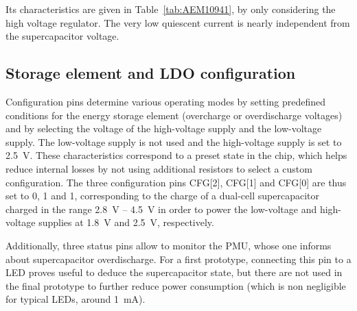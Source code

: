 \documentclass{EPL-master-thesis-covers-EN}
\begin{document}
Its characteristics are given in Table~\ref{tab:AEM10941}, by only considering the high voltage regulator. The very low quiescent current is nearly independent from the supercapacitor voltage.

\begin{table}[H]
\centering
{}
\caption{Characteristics of the AEM10941 PMU}
\label{tab:AEM10941}
\end{table}


\subsection*{Storage element and LDO configuration}

Configuration pins determine various operating modes by setting predefined conditions for the energy storage element (overcharge or overdischarge voltages) and by selecting the voltage of the high-voltage supply and the low-voltage supply.
The low-voltage supply is not used and the high-voltage supply is set to \SI{2.5}{V}. These characteristics correspond to a preset state in the chip, which helps reduce internal losses by not using additional resistors to select a custom configuration. The three configuration pins CFG[2], CFG[1] and CFG[0] are thus set to 0, 1 and 1, corresponding to the charge of a dual-cell supercapacitor charged in the range \SI{2.8}{V} -- \SI{4.5}{V} in order to power the low-voltage and high-voltage supplies at \SI{1.8}{V} and \SI{2.5}{V}, respectively.

Additionally, three status pins allow to monitor the PMU, whose one informs about supercapacitor overdischarge. For a first prototype, connecting this pin to a LED proves useful to deduce the supercapacitor state, but there are not used in the final prototype to further reduce power consumption (which is non negligible for typical LEDs, around \SI{1}{mA}).
\end{document}
